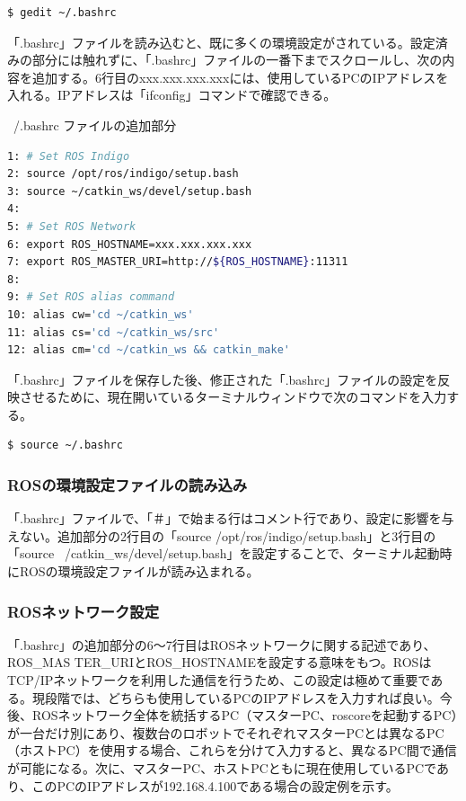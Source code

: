 \begin{lstlisting}[language=ROS]
$ gedit ~/.bashrc
\end{lstlisting}

「.bashrc」ファイルを読み込むと、既に多くの環境設定がされている。設定済みの部分には触れずに、「.bashrc」ファイルの一番下までスクロールし、次の内容を追加する。6行目のxxx.xxx.xxx.xxxには、使用しているPCのIPアドレスを入れる。IPアドレスは「ifconfig」コマンドで確認できる。

~/.bashrc ファイルの追加部分
\begin{lstlisting}[language=bash]
1: # Set ROS Indigo
2: source /opt/ros/indigo/setup.bash
3: source ~/catkin_ws/devel/setup.bash
4:
5: # Set ROS Network
6: export ROS_HOSTNAME=xxx.xxx.xxx.xxx
7: export ROS_MASTER_URI=http://${ROS_HOSTNAME}:11311
8:
9: # Set ROS alias command
10: alias cw='cd ~/catkin_ws'
11: alias cs='cd ~/catkin_ws/src'
12: alias cm='cd ~/catkin_ws && catkin_make'
\end{lstlisting}

「.bashrc」ファイルを保存した後、修正された「.bashrc」ファイルの設定を反映させるために、現在開いているターミナルウィンドウで次のコマンドを入力する。

\begin{lstlisting}[language=bash]
$ source ~/.bashrc
\end{lstlisting}

\subsubsection{ROSの環境設定ファイルの読み込み}

「.bashrc」ファイルで、「＃」で始まる行はコメント行であり、設定に影響を与えない。追加部分の2行目の「source /opt/ros/indigo/setup.bash」と3行目の「source ~/catkin\_ws/devel/setup.bash」を設定することで、ターミナル起動時にROSの環境設定ファイルが読み込まれる。

\subsubsection{ROSネットワーク設定}

「.bashrc」の追加部分の6～7行目はROSネットワークに関する記述であり、ROS\_MAS TER\_URIとROS\_HOSTNAMEを設定する意味をもつ。ROSはTCP/IPネットワークを利用した通信を行うため、この設定は極めて重要である。現段階では、どちらも使用しているPCのIPアドレスを入力すれば良い。今後、ROSネットワーク全体を統括するPC（マスターPC、roscoreを起動するPC）が一台だけ別にあり、複数台のロボットでそれぞれマスターPCとは異なるPC（ホストPC）を使用する場合、これらを分けて入力すると、異なるPC間で通信が可能になる。次に、マスターPC、ホストPCともに現在使用しているPCであり、このPCのIPアドレスが192.168.4.100である場合の設定例を示す。


